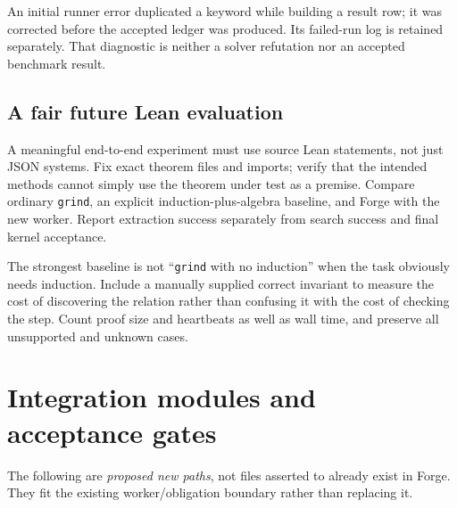 \documentclass[11pt,letterpaper]{article}
\theoremstyle{definition}
\newcommand{\code}[1]{\nolinkurl{#1}}
\begin{document}
An initial runner error duplicated a keyword while building a result row; it
was corrected before the accepted ledger was produced. Its failed-run log is
retained separately. That diagnostic is neither a solver refutation nor an
accepted benchmark result.

\subsection{A fair future Lean evaluation}
A meaningful end-to-end experiment must use source Lean statements, not just
JSON systems. Fix exact theorem files and imports; verify that the intended
methods cannot simply use the theorem under test as a premise. Compare ordinary
\code{grind}, an explicit induction-plus-algebra baseline, and Forge with the new
worker. Report extraction success separately from search success and final
kernel acceptance.

The strongest baseline is not ``\code{grind} with no induction'' when the task
obviously needs induction. Include a manually supplied correct invariant to
measure the cost of discovering the relation rather than confusing it with the
cost of checking the step. Count proof size and heartbeats as well as wall time,
and preserve all unsupported and unknown cases.

\section{Integration modules and acceptance gates}
\label{sec:roadmap}

The following are \emph{proposed new paths}, not files asserted to already exist
in Forge. They fit the existing worker/obligation boundary rather than replacing
it.
\end{document}
